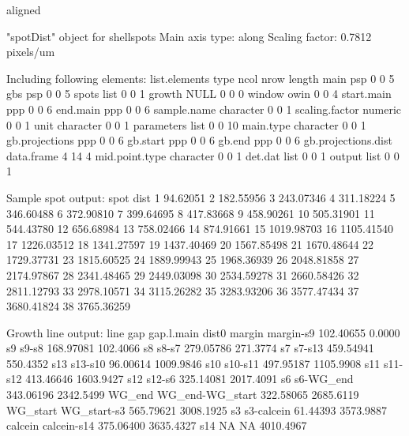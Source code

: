 \documentclass[11pt, a4paper]{article}
\begin{document}
\begin{Schunk}
\begin{Sinput}
 aligned
\end{Sinput}
\begin{Soutput}
"spotDist" object for shellspots
Main axis type: along
Scaling factor: 0.7812 pixels/um

Including following elements:
       list.elements       type ncol nrow length
 main                psp           0    0      5
 gbs                 psp           0    0      5
 spots               list          0    0      1
 growth              NULL          0    0      0
 window              owin          0    0      4
 start.main          ppp           0    0      6
 end.main            ppp           0    0      6
 sample.name         character     0    0      1
 scaling.factor      numeric       0    0      1
 unit                character     0    0      1
 parameters          list          0    0     10
 main.type           character     0    0      1
 gb.projections      ppp           0    0      6
 gb.start            ppp           0    0      6
 gb.end              ppp           0    0      6
 gb.projections.dist data.frame    4   14      4
 mid.point.type      character     0    0      1
 det.dat             list          0    0      1
 output              list          0    0      1

Sample spot output:
 spot       dist
   1    94.62051
   2   182.55956
   3   243.07346
   4   311.18224
   5   346.60488
   6   372.90810
   7   399.64695
   8   417.83668
   9   458.90261
   10  505.31901
   11  544.43780
   12  656.68984
   13  758.02466
   14  874.91661
   15 1019.98703
   16 1105.41540
   17 1226.03512
   18 1341.27597
   19 1437.40469
   20 1567.85498
   21 1670.48644
   22 1729.37731
   23 1815.60525
   24 1889.99943
   25 1968.36939
   26 2048.81858
   27 2174.97867
   28 2341.48465
   29 2449.03098
   30 2534.59278
   31 2660.58426
   32 2811.12793
   33 2978.10571
   34 3115.26282
   35 3283.93206
   36 3577.47434
   37 3680.41824
   38 3765.36259

Growth line output:
     line             gap gap.l.main     dist0
 margin   margin-s9        102.40655    0.0000
 s9       s9-s8            168.97081  102.4066
 s8       s8-s7            279.05786  271.3774
 s7       s7-s13           459.54941  550.4352
 s13      s13-s10           96.00614 1009.9846
 s10      s10-s11          497.95187 1105.9908
 s11      s11-s12          413.46646 1603.9427
 s12      s12-s6           325.14081 2017.4091
 s6       s6-WG_end        343.06196 2342.5499
 WG_end   WG_end-WG_start  322.58065 2685.6119
 WG_start WG_start-s3      565.79621 3008.1925
 s3       s3-calcein        61.44393 3573.9887
 calcein  calcein-s14      375.06400 3635.4327
 s14      NA                      NA 4010.4967
\end{Soutput}
\end{Schunk}
\end{document}
